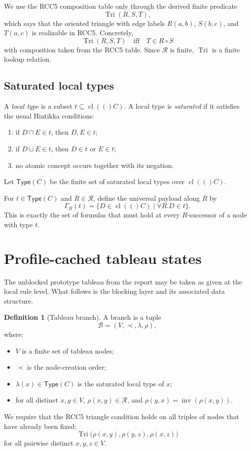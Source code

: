\documentclass[11pt]{article}
\theoremstyle{definition}
\newtheorem{definition}[theorem]{Definition}
\newcommand{\Roles}{\mathcal{R}}
\newcommand{\inv}{\operatorname{inv}}
\newcommand{\cl}[1]{\operatorname{cl}(#1)}
\newcommand{\Tri}{\operatorname{Tri}}
\begin{document}
We use the RCC5 composition table only through the derived finite predicate
\[
\Tri(R,S,T),
\]
which says that the oriented triangle with edge labels $R(a,b)$, $S(b,c)$, and $T(a,c)$ is realizable in RCC5. Concretely,
\[
\Tri(R,S,T) \quad\text{iff}\quad T\in R\circ S
\]
with composition taken from the RCC5 table. Since $\Roles$ is finite, $\Tri$ is a finite lookup relation.

\subsection{Saturated local types}

A \emph{local type} is a subset $t\subseteq \cl(C)$. A local type is \emph{saturated} if it satisfies the usual Hintikka conditions:
\begin{enumerate}[label=(\roman*)]
  \item if $D\sqcap E\in t$, then $D,E\in t$;
  \item if $D\sqcup E\in t$, then $D\in t$ or $E\in t$;
  \item no atomic concept occurs together with its negation.
\end{enumerate}
Let $\mathsf{Type}(C)$ be the finite set of saturated local types over $\cl(C)$.

For $t\in\mathsf{Type}(C)$ and $R\in\Roles$, define the universal payload along $R$ by
\[
\Gamma_R(t)=\{D\in\cl(C)\mid \forall R.D\in t\}.
\]
This is exactly the set of formulas that must hold at every $R$-successor of a node with type $t$.

\section{Profile-cached tableau states}

The unblocked prototype tableau from the report may be taken as given at the local rule level. What follows is the blocking layer and its associated data structure.

\begin{definition}[Tableau branch]
A branch is a tuple
\[
\mathcal B=(V,\prec,\lambda,\rho),
\]
where:
\begin{itemize}
  \item $V$ is a finite set of tableau nodes;
  \item $\prec$ is the node-creation order;
  \item $\lambda(x)\in\mathsf{Type}(C)$ is the saturated local type of $x$;
  \item for all distinct $x,y\in V$, $\rho(x,y)\in\Roles$, and $\rho(y,x)=\inv(\rho(x,y))$.
\end{itemize}
We require that the RCC5 triangle condition holds on all triples of nodes that have already been fixed:
\[
\Tri\bigl(\rho(x,y),\rho(y,z),\rho(x,z)\bigr)
\]
for all pairwise distinct $x,y,z\in V$.
\end{definition}
\end{document}
